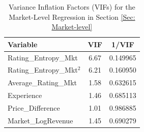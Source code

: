 \documentclass[msom,blindrev]{informs3}
\begin{document}
%
\begin{table}[H]
\centering
\begin{tabular}{@{}lcc@{}}
\toprule
Variable           & VIF  & 1/VIF    \\ \midrule
Rating\_Entropy\_Mkt    & 6.67 & 0.149965 \\
Rating\_Entropy\_Mkt$^2$ & 6.21 & 0.160950 \\
Average\_Rating\_Mkt     & 1.58 & 0.632615 \\
Experience     & 1.46 & 0.685113 \\
Price\_Difference   & 1.01 & 0.986885 \\
Market\_LogRevenue     & 1.45 & 0.690279 \\ \bottomrule
\end{tabular}
\caption{Variance Inflation Factors (VIFs) for the Market-Level Regression in Section \ref{Sec: Market-level}}
\label{vif_mkt}
\end{table}




	
	
	
	
	
		
		
		

		
		
%		
		
        
%		
		
		
		
\end{document}
